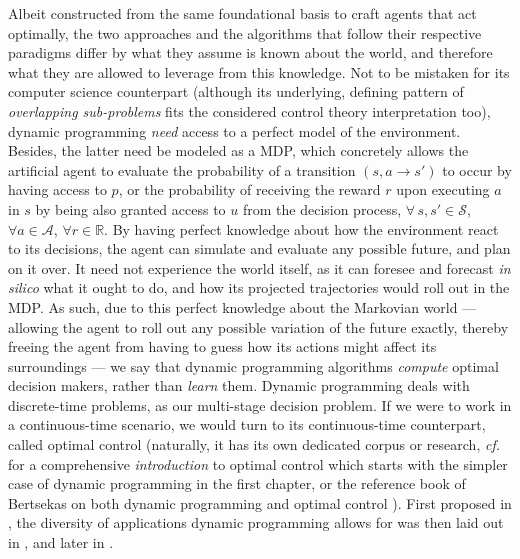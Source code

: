 Albeit constructed from the same foundational basis to craft agents that act optimally,
the two approaches and the algorithms that follow their respective paradigms differ by what they assume
is known about the world, and therefore what they are allowed to leverage from this knowledge.
Not to be mistaken for its computer science counterpart
(although its underlying, defining pattern of \textit{overlapping sub-problems}
fits the considered control theory interpretation too),
dynamic programming \emph{need} access to a perfect model of the environment.
Besides, the latter need be modeled as a MDP,
which concretely allows the artificial agent to evaluate the probability of a transition $(s,a \to s')$
to occur by having access to $p$, or the probability of receiving the reward $r$ upon executing $a$ in $s$
by being also granted access to $u$ from the decision process,
$\forall \, s, s' \in \mathcal{S}$, $\forall a \in \mathcal{A}$, $\forall r \in \mathbb{R}$.
By having perfect knowledge about how the environment react to its decisions,
the agent can simulate and evaluate any possible future, and plan on it over.
It need not experience the world itself, as it can foresee and forecast \textit{in silico} what it ought to do,
and how its projected trajectories would roll out in the MDP.
As such, due to this perfect knowledge about the Markovian world ---
allowing the agent to roll out any possible variation of the future exactly, thereby
freeing the agent from having to guess how its actions might affect its surroundings ---
we say that dynamic programming algorithms \emph{compute} optimal decision makers,
rather than \emph{learn} them.
Dynamic programming deals with discrete-time problems, as our multi-stage decision problem.
If we were to work in a continuous-time scenario, we would turn to its continuous-time counterpart,
called optimal control (naturally, it has its own dedicated corpus or research,
\textit{cf.} \cite{Kirk2004-dq} for a comprehensive \textit{introduction} to optimal control
which starts with the simpler case of dynamic programming in the first chapter,
or the reference book of Bertsekas on both dynamic programming and optimal control \cite{Bertsekas2000-yi}).
First proposed in \cite{Bellman1957-om}, the diversity of applications dynamic programming allows for was then
laid out in \cite{Bellman1962-oi}, and later in \cite{Dreyfus1977-fv}.

